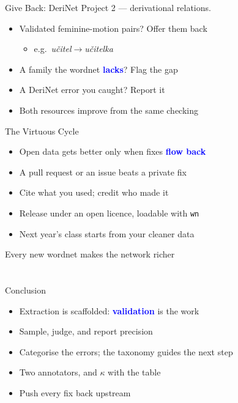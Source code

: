 \documentclass[xetex,aspectratio=169]{beamer}
\newcommand{\txx}[1]{\textbf{\textcolor{blue}{#1}}}
\newcommand{\into}{\ensuremath{\rightarrow}\xspace}
\begin{document}
\begin{frame}{Give Back: DeriNet}
  Project 2 --- derivational relations.
  \begin{itemize}
  \item Validated feminine-motion pairs? Offer them back
    \begin{itemize}
    \item e.g.\ \textit{u\v{c}itel}\into\textit{u\v{c}itelka}
    \end{itemize}
  \item A family the wordnet \txx{lacks}? Flag the gap
  \item A DeriNet error you caught? Report it
  \item Both resources improve from the same checking
  \end{itemize}
\end{frame}

\begin{frame}{The Virtuous Cycle}
  \begin{itemize}
  \item Open data gets better only when fixes \txx{flow back}
  \item A pull request or an issue beats a private fix
  \item Cite what you used; credit who made it
  \item Release under an open licence, loadable with \texttt{wn}
  \item Next year's class starts from your cleaner data
  \end{itemize}
  \bigskip
  \centering\small Every new wordnet makes the network richer
\end{frame}

\section*{}

\begin{frame}{Conclusion}
  \begin{itemize}
  \item Extraction is scaffolded: \txx{validation} is the work
  \item Sample, judge, and report precision
  \item Categorise the errors; the taxonomy guides the next step
  \item Two annotators, and $\kappa$ with the table
  \item Push every fix back upstream
  \end{itemize}
\end{frame}
\end{document}
